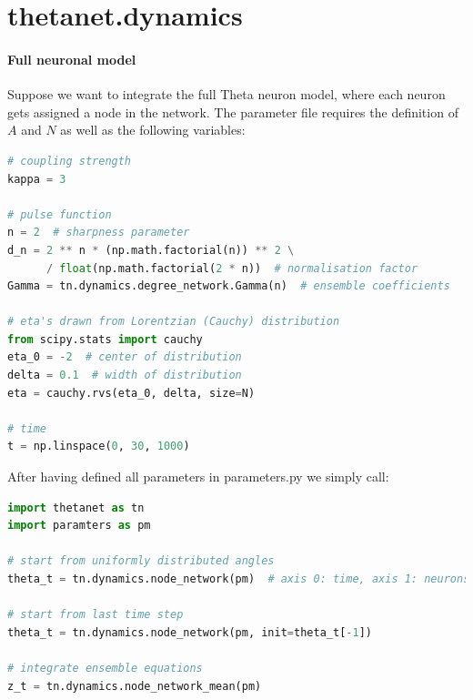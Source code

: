 \documentclass[bibliography=totoc, twoside]{article}
\numberwithin{equation}{section}
\begin{document}
\section{thetanet.dynamics}
\paragraph*{Full neuronal model}
Suppose we want to integrate the full Theta neuron model, where each neuron gets assigned a node in the network.
The parameter file requires the definition of $A$ and $N$ as well as the following variables:
\begin{lstlisting}[language=python]
# coupling strength
kappa = 3

# pulse function
n = 2  # sharpness parameter
d_n = 2 ** n * (np.math.factorial(n)) ** 2 \
      / float(np.math.factorial(2 * n))  # normalisation factor
Gamma = tn.dynamics.degree_network.Gamma(n)  # ensemble coefficients

# eta's drawn from Lorentzian (Cauchy) distribution
from scipy.stats import cauchy
eta_0 = -2  # center of distribution
delta = 0.1  # width of distribution
eta = cauchy.rvs(eta_0, delta, size=N)

# time
t = np.linspace(0, 30, 1000)
\end{lstlisting}
After having defined all parameters in parameters.py we simply call:
\begin{lstlisting}[language=python]
import thetanet as tn
import paramters as pm

# start from uniformly distributed angles
theta_t = tn.dynamics.node_network(pm)  # axis 0: time, axis 1: neurons

# start from last time step
theta_t = tn.dynamics.node_network(pm, init=theta_t[-1])

# integrate ensemble equations
z_t = tn.dynamics.node_network_mean(pm)
\end{lstlisting}
\end{document}
